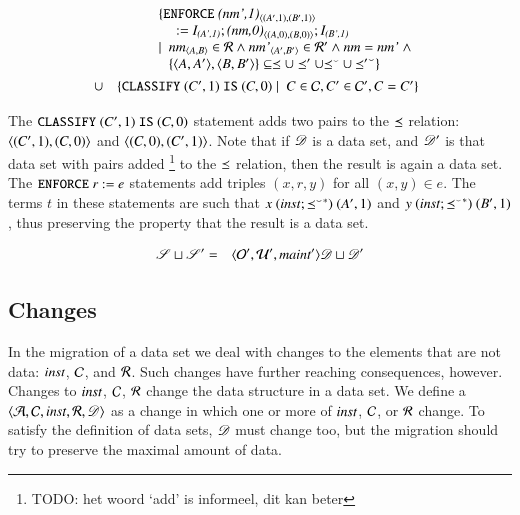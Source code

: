 \documentclass{elsarticle}
\begin{document}
\begin{definition}
   \begin{eqnarray}
      &&\begin{array}[t]{@{}l}
         \{ {\tt ENFORCE\ }\declare{(nm',1)}{(A',1)}{(B',1)}\\\quad{\tt\ :=\ }\ident{(A',1)};\declare{(nm,0)}{(A,0)}{(B,0)};\ident{(B',1)}\\
            \mid\ \begin{array}[t]{@{}l}
               \declare{nm}{A}{B}\in\rels\wedge\declare{nm'}{A'}{B'}\in\rels'\wedge\id{nm}=\id{nm'}\ \wedge\\
               \{\pair{A}{A'},\pair{B}{B'}\}\subseteq\isa\cup\isa'\cup\flip{\isa}\cup\flip{\isa'}\}
               \end{array}
           \end{array}\\
           &\cup&\begin{array}[t]{@{}l}
            \{ {\tt CLASSIFY\ }(C',1){\tt\ IS\ }(C,0)\mid\ C\in\concepts,C'\in\concepts',C=C'\}\\
           \end{array}
   \end{eqnarray}
\end{definition}

The ${\tt CLASSIFY\ }(C',1){\tt\ IS\ }(C,0)$ statement adds two pairs to the $\preceq$ relation:
$\langle{(C',1)},{(C,0)}\rangle$ and $\langle{(C,0)},{(C',1)}\rangle$.
Note that if $\mathscr{D}$ is a data set, and $\mathscr{D}'$ is that data set with pairs added%
\footnote{TODO: het woord `add' is informeel, dit kan beter} to the $\preceq$ relation, then the result is again a data set.
The ${\tt ENFORCE\ }r{\tt\ :=\ }e$ statements add triples $(x,r,y)$ for all $(x,y)\in e$.
The terms $t$ in these statements are such that $x\ (\mathbin{\text{\it inst\/}} ; {{\preceq}^\smallsmile}^*)\ (A',1)$ and $y \ (\inst \compose \kleenestar{\flip{\isa}})\ (B',1)$, thus preserving the property that the result is a data set.

\begin{definition}[]
   \begin{eqnarray}
      \mathscr{S}\sqcup\mathscr{S}'&=&\langle{\mathcal{O}'},{\mathcal{U}'},{\mathbin{\text{\it maint\/}}'}\rangle{\mathscr{D}\sqcup\mathscr{D}'}
   \end{eqnarray}
\end{definition}

\subsection{Changes}
   In the migration of a data set we deal with changes to the elements that are not data:
   $\mathbin{\text{\it inst\/}}$, $\mathcal{C}$, and $\mathcal{R}$.
   Such changes have further reaching consequences, however.
   Changes to $\mathbin{\text{\it inst\/}}$, $\mathcal{C}$, $\mathcal{R}$ change the data structure in a data set.
   We define a  $\langle\mathcal{A},\mathcal{C},\mathbin{\text{\it inst\/}},\mathcal{R},\mathscr{D}\rangle$ as a change in which one or more of $\mathbin{\text{\it inst\/}}$, $\mathcal{C}$, or $\mathcal{R}$ change.
   To satisfy the definition of data sets, $\mathscr{D}$ must change too,
   but the migration should try to preserve the maximal amount of data.
\end{document}
